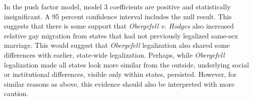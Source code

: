 \documentclass[12pt,letterpaper]{article}
\begin{document}
In the push factor model, model 3 coefficients are positive and statistically insignificant. A 95 percent confidence interval includes the null result. This suggests that there is some support that \textit{Obergefell v. Hodges} also increased relative gay migration from states that had not previously legalized same-sex marriage. This would suggest that \textit{Obergefell} legalization also shared some differences with earlier, state-wide legalization. Perhaps, while \textit{Obergefell} legalization made all states look more similar from the outside, underlying social or institutional differences, visible only within states, persisted. However, for similar reasons as above, this evidence should also be interpreted with more caution.

\FloatBarrier
\end{document}
